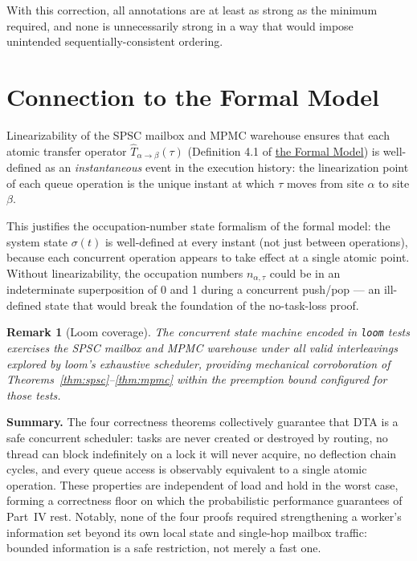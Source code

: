 \documentclass[11pt,a4paper]{article}
\newtheorem{remark}{Remark}[section]
\newcommand{\code}[1]{\texttt{#1}}
\begin{document}
With this correction, all annotations are at least as strong as the
minimum required, and none is unnecessarily strong in a way that
would impose unintended sequentially-consistent ordering.

\section{Connection to the Formal Model}
\label{sec:causal}

Linearizability of the SPSC mailbox and MPMC warehouse ensures that
each atomic transfer operator $\hat{T}_{\alpha \to \beta}(\tau)$
(Definition 4.1 of \hyperref[chap:formal_model]{the Formal Model}) is well-defined as an
\emph{instantaneous} event in the execution history: the
linearization point of each queue operation is the unique instant at
which $\tau$ moves from site $\alpha$ to site $\beta$.

This justifies the occupation-number state formalism of the formal
model: the system state $\sigma(t)$ is well-defined at every instant
(not just between operations), because each concurrent operation
appears to take effect at a single atomic point.  Without
linearizability, the occupation numbers $n_{\alpha,\tau}$ could be
in an indeterminate superposition of 0 and 1 during a concurrent
push/pop --- an ill-defined state that would break the foundation of
the no-task-loss proof.

\begin{remark}[Loom coverage]
The concurrent state machine encoded in \code{loom} tests exercises
the SPSC mailbox and MPMC warehouse under all valid interleavings
explored by loom's exhaustive scheduler, providing mechanical
corroboration of Theorems~\ref{thm:spsc}--\ref{thm:mpmc} within the
preemption bound configured for those tests.
\end{remark}


\bigskip
\noindent\textbf{Summary.}
The four correctness theorems collectively guarantee that DTA is a
safe concurrent scheduler: tasks are never created or destroyed by
routing, no thread can block indefinitely on a lock it will never acquire,
no deflection chain cycles, and every queue access is observably equivalent
to a single atomic operation.  These properties are independent of load
and hold in the worst case, forming a correctness floor on which the
probabilistic performance guarantees of Part~IV rest. Notably, none of
the four proofs required strengthening a worker's information set beyond
its own local state and single-hop mailbox traffic: bounded information
is a safe restriction, not merely a fast one.
\end{document}
